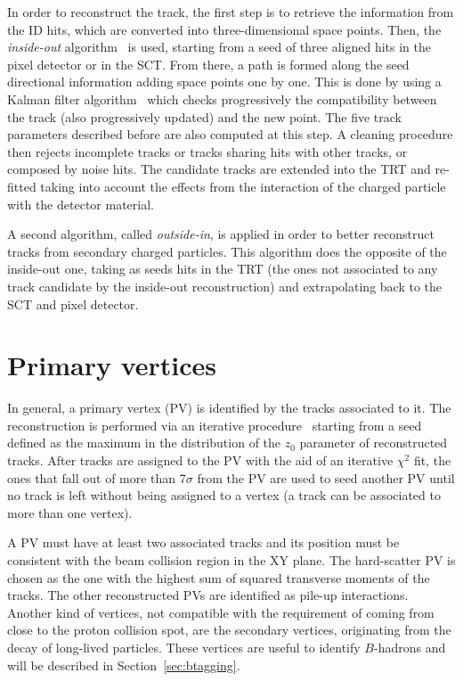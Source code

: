 In order to reconstruct the track, the first step is to retrieve the information from
the ID hits, which are converted into three-dimensional space points. Then, 
the {\it inside-out} algorithm~\cite{Cornelissen:1020106} is used, starting from a
seed of three aligned hits in the pixel detector or in the SCT.
From there, a path is formed along the seed directional information adding
space points one by one. This is done by using a Kalman filter algorithm~\cite{Frühwirth1987444}
which checks progressively the compatibility between the track (also progressively updated)
and the new point. The five track parameters described before are also computed at this step.
A cleaning procedure then 
rejects incomplete tracks or tracks sharing hits with other tracks,
or composed by %
noise hits. The candidate tracks are extended
into the TRT and re-fitted taking into account the effects from the interaction
of the charged particle with the detector material. 

A second algorithm, called {\it outside-in}, is applied in order to better
reconstruct tracks from secondary charged particles. This algorithm does
the opposite of the inside-out one, taking as seeds hits in the TRT (the
ones not associated to any track candidate by the inside-out reconstruction)
and extrapolating back to the SCT and pixel detector.


\section{Primary vertices}\label{sec:primaryvertex}

In general, a primary vertex (PV) is identified by the tracks associated to it.
The reconstruction is performed via an iterative procedure~\cite{ATLAS-CONF-2010-069}
starting from a seed defined as the maximum in the distribution of the $z_0$ parameter
of reconstructed tracks. After tracks are assigned to the PV with the aid of an
iterative $\chi^2$ fit, the ones that fall out of more than 7$\sigma$ from the PV
are used to seed another PV until no track is left without being assigned to a vertex
(a track can be associated to more than one vertex).

A PV must have at least two associated tracks and its position must be consistent with 
the beam collision region in the XY plane. The hard-scatter PV is chosen as the one
with the highest sum of squared transverse moments of the tracks. The other reconstructed PVs 
are identified as pile-up interactions. Another kind of vertices, not
compatible with the requirement of coming from close to the proton collision spot,
are the secondary vertices, originating from the decay of long-lived particles.
These vertices are useful to identify $B$-hadrons and will be described in Section~\ref{sec:btagging}.

